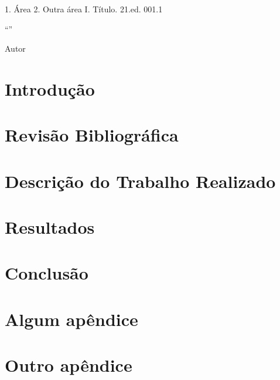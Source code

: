 \documentclass{../ufpatcc}
\begin{document}
  \capa
  \folhaderosto
                     {1. Área 2. Outra área I. Título.}
                     {21.ed. 001.1}
  \folhadeaprovacao{\today}
  \begin{dedicatoria}
    \lipsum[13]
  \end{dedicatoria}
  \begin{agradecimentos}
    \lipsum[1-5]
  \end{agradecimentos}
  \begin{epigrafe}
    ``\lipsum*[101]''\par
      Autor
  \end{epigrafe}
  \begin{resumo}
    \lipsum[1]
  \end{resumo}
  \begin{abstract}
    \lipsum[1]
  \end{abstract}
  \tableofcontents

  \chapter*{Introdução}
  \chapter{Revisão Bibliográfica} %
    \lipsum[1]\cite{atalholivro}
    \lipsum[2]\cite{atalhoonline}
  \chapter{Descrição do Trabalho Realizado}
  \chapter{Resultados}
  \chapter*{Conclusão}

  \appendix
    \chapter{Algum apêndice}
    \chapter{Outro apêndice}

\end{document}
